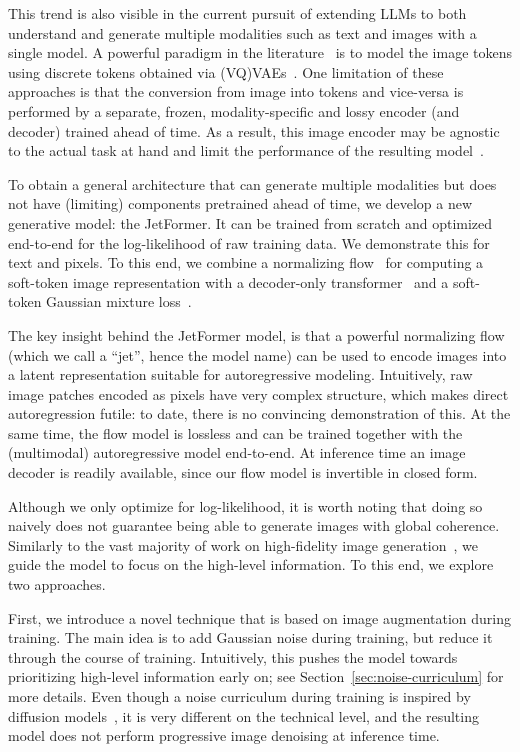 \documentclass{article} %
\newcommand{\name}{JetFormer\xspace}
\begin{document}
This trend is also visible in the current pursuit of extending LLMs to both understand and generate multiple modalities such as text and images with a single model. A powerful paradigm in the literature~\citep{aghajanyan2022cm3, kim2023magvlt, aghajanyan2023scaling, you2023cobit} is to model the image tokens using discrete tokens obtained via (VQ)VAEs~\citep{van2017neural, esser2020taming, ramesh2021zero}.
One limitation of these approaches is that the conversion from image into tokens and vice-versa is performed by a separate, frozen, modality-specific and lossy encoder (and decoder) trained ahead of time. As a result, this image encoder may be agnostic to the actual task at hand and limit the performance of the resulting model~\citep{dongdreamllm, pan2024auto, xu2024libra}.

To obtain a general architecture that can generate multiple modalities but does not have (limiting) components pretrained ahead of time, we develop a new generative model: the \name. It can be trained from scratch and optimized end-to-end for the log-likelihood of raw training data. We demonstrate this for text and pixels. To this end, we combine a normalizing flow~\citep{dinh2016density,kingma2018glow} for computing a soft-token image representation with a  decoder-only transformer~\citep{vaswani2017attention} and a soft-token Gaussian mixture loss~\citep{tschannen2023givt}.

The key insight behind the \name model, is that a powerful normalizing flow (which we call a ``jet'', hence the model name) can be used to encode images into a latent representation suitable for autoregressive modeling. Intuitively, raw image patches encoded as pixels have very complex structure, which makes direct autoregression futile: to date, there is no convincing demonstration of this. At the same time, the flow model is lossless and can be trained together with the (multimodal) autoregressive model end-to-end. At inference time an image decoder is readily available, since our flow model is invertible in closed form.

Although we only optimize for log-likelihood, it is worth noting that doing so naively %
does not guarantee being able to generate images with global coherence. Similarly to the vast majority of work on high-fidelity image generation~\citep{esser2020taming, dhariwal2021diffusion, ho2022classifier}, we guide the model to focus on the high-level information. To this end, we explore two approaches.

First, we introduce a novel technique that is based on image augmentation during training. The main idea is to add Gaussian noise during training, but reduce it through the course of training. Intuitively, this pushes the model towards prioritizing high-level information early on; see Section~\ref{sec:noise-curriculum} for more details. Even though a noise curriculum during training is inspired by diffusion models~\citep{sohl2015deep}, it is very different on the technical level, and the resulting model does not perform progressive image denoising at inference time.
\end{document}
